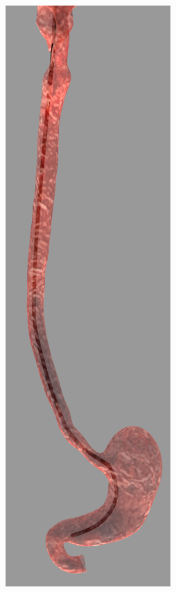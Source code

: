 \documentclass[12pt,a4]{article}
\begin{document}
\begin{figure}[ht!]
\begin{subfigure}{0.15\textwidth}
    \end{subfigure}%
    ~
        \begin{subfigure}{0.15\textwidth}
        \centering
        \includegraphics[width=0.6\linewidth]{figures/GIsnaps/5.png}
      

\end{subfigure}
\end{figure}
\end{document}
